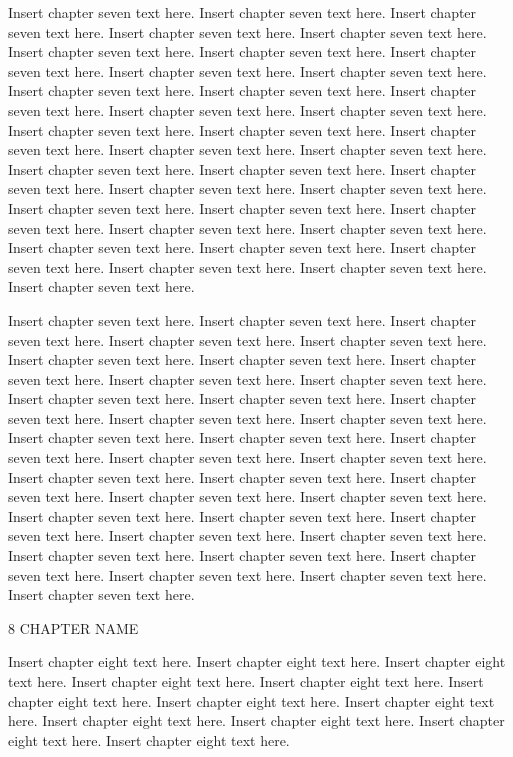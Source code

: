 Insert chapter seven text here. Insert chapter seven text here. Insert chapter seven text here. Insert chapter seven text here. Insert chapter seven text here. Insert chapter seven text here. Insert chapter seven text here. Insert chapter seven text here. Insert chapter seven text here. Insert chapter seven text here. Insert chapter seven text here. Insert chapter seven text here. Insert chapter seven text here. Insert chapter seven text here. Insert chapter seven text here. Insert chapter seven text here. Insert chapter seven text here. Insert chapter seven text here. Insert chapter seven text here. Insert chapter seven text here. Insert chapter seven text here. Insert chapter seven text here. Insert chapter seven text here. Insert chapter seven text here. Insert chapter seven text here. Insert chapter seven text here. Insert chapter seven text here. Insert chapter seven text here. Insert chapter seven text here. Insert chapter seven text here. Insert chapter seven text here. Insert chapter seven text here. Insert chapter seven text here. Insert chapter seven text here. Insert chapter seven text here. Insert chapter seven text here.

Insert chapter seven text here. Insert chapter seven text here. Insert chapter seven text here. Insert chapter seven text here. Insert chapter seven text here. Insert chapter seven text here. Insert chapter seven text here. Insert chapter seven text here. Insert chapter seven text here. Insert chapter seven text here. Insert chapter seven text here. Insert chapter seven text here. Insert chapter seven text here. Insert chapter seven text here. Insert chapter seven text here. Insert chapter seven text here. Insert chapter seven text here. Insert chapter seven text here. Insert chapter seven text here. Insert chapter seven text here. Insert chapter seven text here. Insert chapter seven text here. Insert chapter seven text here. Insert chapter seven text here. Insert chapter seven text here. Insert chapter seven text here. Insert chapter seven text here. Insert chapter seven text here. Insert chapter seven text here. Insert chapter seven text here. Insert chapter seven text here. Insert chapter seven text here. Insert chapter seven text here. Insert chapter seven text here. Insert chapter seven text here. Insert chapter seven text here.

8 CHAPTER NAME

Insert chapter eight text here. Insert chapter eight text here. Insert chapter eight text here. Insert chapter eight text here. Insert chapter eight text here. Insert chapter eight text here. Insert chapter eight text here. Insert chapter eight text here. Insert chapter eight text here. Insert chapter eight text here. Insert chapter eight text here. Insert chapter eight text here.

